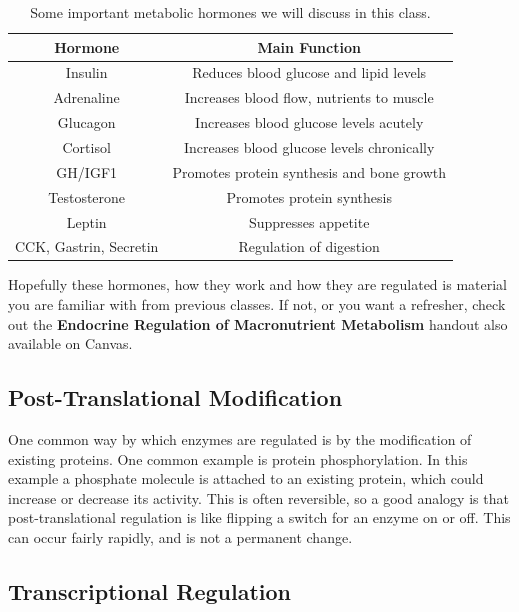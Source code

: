 \documentclass{tufte-handout}
\begin{document}
\begin{table}[h]
\centering
\caption{Some important metabolic hormones we will discuss in this class.}
\label{tab:hormones}
\begin{tabular}{cc}
\hline
\textbf{Hormone}       & \textbf{Main Function}                     \\
\hline
Insulin                & Reduces blood glucose and lipid levels     \\
Adrenaline        & Increases blood flow, nutrients to muscle \\
Glucagon               & Increases blood glucose levels acutely     \\
Cortisol               & Increases blood glucose levels chronically \\
GH/IGF1                & Promotes protein synthesis and bone growth \\
Testosterone           & Promotes protein synthesis                 \\
Leptin                 & Suppresses appetite                        \\
CCK, Gastrin, Secretin & Regulation of digestion                   \\
\hline
\end{tabular}
\end{table}


Hopefully these hormones, how they work and how they are regulated is material you are familiar with from previous classes.  If not, or you want a refresher, check out the \textbf{Endocrine Regulation of Macronutrient Metabolism} handout also available on Canvas.  

\subsection{Post-Translational Modification}

One common way by which enzymes are regulated is by the modification of existing proteins.  One common example is protein phosphorylation.  In this example a phosphate molecule is attached to an existing protein, which could increase or decrease its activity.  This is often reversible, so a good analogy is that post-translational regulation is like flipping a switch for an enzyme on or off.  This can occur fairly rapidly, and is not a permanent change.

\subsection{Transcriptional Regulation}
\end{document}
